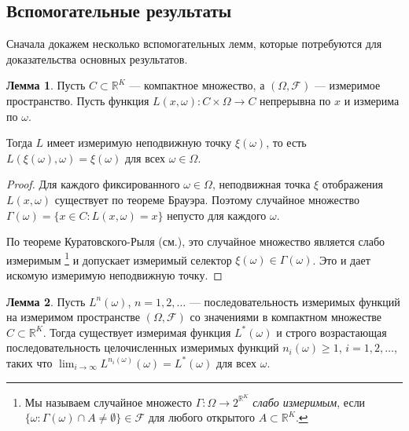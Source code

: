 \documentclass[a4paper,12pt,russian]{article} %
\theoremstyle{definition}
\newtheorem{lemma}{Лемма}
\newcommand{\F}{\mathcal{F}}
\newcommand{\R}{\mathbb{R}}
\begin{document}
\subsection{Вспомогательные результаты}
Сначала докажем несколько вспомогательных лемм, которые потребуются для доказательства основных результатов.


\begin{lemma}
\label{lemma1-fixed-point}
Пусть $C\subset\R^K$ — компактное множество, а $(\Omega,\F)$ — измеримое пространство.
Пусть функция $L(x,\omega)\colon C\times\Omega\to C$ непрерывна по $x$ и измерима по $\omega$.

Тогда $L$ имеет измеримую неподвижную точку $\xi(\omega)$, то есть \ $L(\xi(\omega),\omega) = \xi(\omega)$ для всех $\omega\in\Omega$. 
\end{lemma}

\begin{proof}
Для каждого фиксированного $\omega\in\Omega$, неподвижная точка $\xi$ отображения $L(x,\omega)$ существует по теореме Брауэра.
Поэтому случайное множество $\Gamma(\omega) = \{x\in C : L(x,\omega)=x\}$ непусто для каждого $\omega$.

По теореме Куратовского-Рыля (см.\cite[ Т.~18.13]{Aliprantis2006}), это случайное множество является слабо измеримым \footnote{Мы называем случайное множесто $\Gamma\colon\Omega\to 2^{\R^K}$ \emph{слабо измеримым}, если  $\{\omega : \Gamma(\omega)\cap A \neq \emptyset\} \in \F$ для любого открытого $A\subset \R^K$.} и допускает измеримый селектор $\xi(\omega)\in \Gamma(\omega)$. Это и дает искомую измеримую неподвижную точку. 
\end{proof}


\begin{lemma}
\label{lemma2-convergent-subsequence}
Пусть $L^{n}(\omega)$, $n=1,2,\dots$ — последовательность измеримых функций на измеримом пространстве $(\Omega,\F)$ со значениями в компактном множестве $C\subset\R^K$.
Тогда существует измеримая функция $L^*(\omega)$ и строго возрастающая последовательность целочисленных измеримых функций $n_i(\omega)\ge 1$, $i=1,2,\dots$, таких что $\lim_{i\to\infty}L^{n_i(\omega)}(\omega) = L^*(\omega)$ для всех $\omega$. 
\end{lemma}

\end{document}
